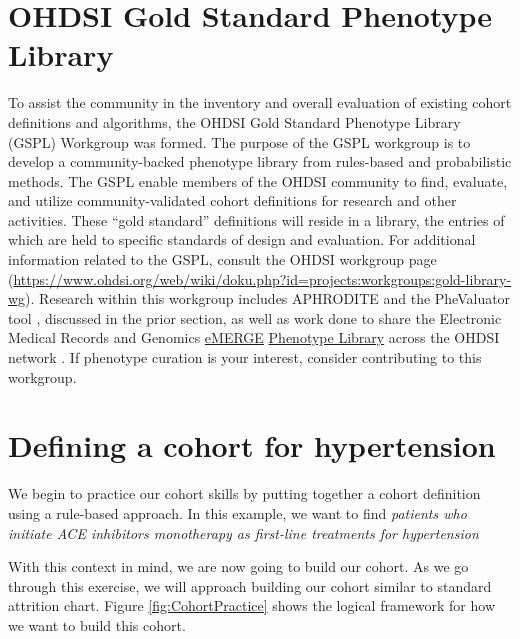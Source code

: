 \documentclass[11pt]{book}
\theoremstyle{definition}
\theoremstyle{definition}
\theoremstyle{definition}
\theoremstyle{remark}
\begin{document}
\hypertarget{ohdsi-gold-standard-phenotype-library}{%
\section{OHDSI Gold Standard Phenotype Library}\label{ohdsi-gold-standard-phenotype-library}}

To assist the community in the inventory and overall evaluation of existing cohort definitions and algorithms, the OHDSI Gold Standard Phenotype Library (GSPL) Workgroup was formed. The purpose of the GSPL workgroup is to develop a community-backed phenotype library from rules-based and probabilistic methods. The GSPL enable members of the OHDSI community to find, evaluate, and utilize community-validated cohort definitions for research and other activities. These ``gold standard'' definitions will reside in a library, the entries of which are held to specific standards of design and evaluation. For additional information related to the GSPL, consult the OHDSI workgroup page (\url{https://www.ohdsi.org/web/wiki/doku.php?id=projects:workgroups:gold-library-wg}). Research within this workgroup includes APHRODITE \citep{Banda2017APHRODITE} and the PheValuator tool \citep{Swerdel2019phevaluator} , discussed in the prior section, as well as work done to share the Electronic Medical Records and Genomics \href{https://emerge.mc.vanderbilt.edu/}{eMERGE} \href{https://phekb.org/phenotypes}{Phenotype Library} across the OHDSI network \citep{Hripcsak2019eMERGE}. If phenotype curation is your interest, consider contributing to this workgroup. 

\hypertarget{defining-a-cohort-for-hypertension}{%
\section{Defining a cohort for hypertension}\label{defining-a-cohort-for-hypertension}}

We begin to practice our cohort skills by putting together a cohort definition using a rule-based approach. In this example, we want to find \emph{patients who initiate ACE inhibitors monotherapy as first-line treatments for hypertension}

With this context in mind, we are now going to build our cohort. As we go through this exercise, we will approach building our cohort similar to standard attrition chart. Figure \ref{fig:CohortPractice} shows the logical framework for how we want to build this cohort.
\end{document}
